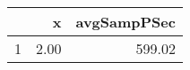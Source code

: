 \begin{table}[h]
\centering
\begin{tabular}{rrr}
  \hline
 & x & avgSampPSec \\ 
  \hline
1 & 2.00 & 599.02 \\ 
   \hline
\end{tabular}
\end{table}
